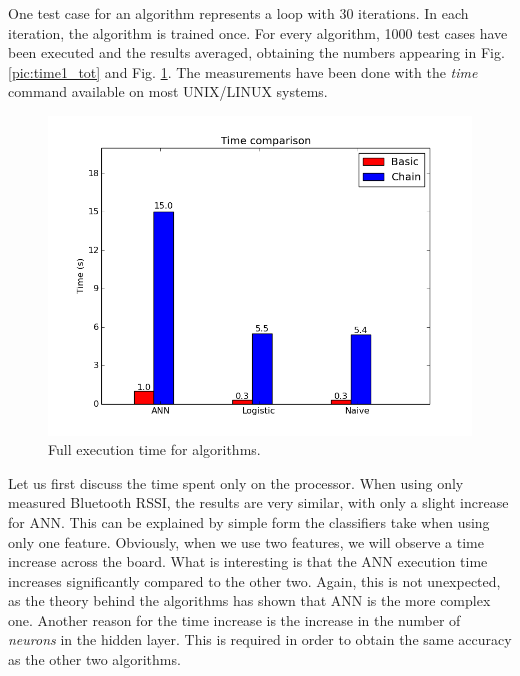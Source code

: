One test case for an algorithm represents a loop with 30 iterations. In each iteration, the algorithm is trained once. For every algorithm, 1000 test cases have been executed and the results averaged, obtaining the numbers appearing in Fig. \ref{pic:time1_tot} and Fig. \ref{pic:time2_tot}. The measurements have been done with the \textit{time} command available on most UNIX/LINUX systems. 

\begin{figure}[h]
	\begin{center}
		\includegraphics[scale=0.6]{figures/time2_tot.png}
	\end{center}
	
	\caption{Full execution time for algorithms.}
	\label{pic:time2_tot}

\end{figure}

Let us first discuss the time spent only on the processor. When using only measured Bluetooth RSSI, the results are very similar, with only a slight increase for ANN. This can be explained by simple form the classifiers take when using only one feature. Obviously, when we use two features, we will observe a time increase across the board. What is interesting is that the ANN execution time increases significantly compared to the other two. Again, this is not unexpected, as the theory behind the algorithms has shown that ANN is the more complex one. Another reason for the time increase is the increase in the number of \textit{neurons} in the hidden layer. This is required in order to obtain the same accuracy as the other two algorithms.

